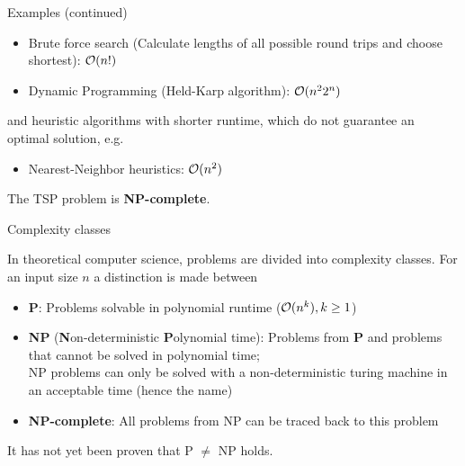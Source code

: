 \documentclass[11pt,compress,t,notes=noshow, xcolor=table]{beamer}
\begin{document}
\begin{vbframe}{Examples (continued)}
\begin{itemize}
  \item Brute force search (Calculate lengths of all possible round trips and choose shortest): $\mathcal{O}(n!)$
  \item Dynamic Programming (Held-Karp algorithm): $\mathcal{O}(n^22^n)$
\end{itemize}

and heuristic algorithms with shorter runtime, which do not guarantee an optimal solution, e.g.

\begin{itemize}
  \item Nearest-Neighbor heuristics: $\mathcal{O}(n^2)$
\end{itemize}

The TSP problem is \textbf{NP-complete}.

\end{vbframe}


\begin{vbframe}{Complexity classes}

In theoretical computer science, problems are divided into complexity classes. For an input size $n$ a distinction is made between

\begin{itemize}
\item \textbf{P}: Problems solvable in polynomial runtime ($\mathcal{O}(n^k), k\ge 1$)
\item \textbf{NP} (\textbf{N}on-deterministic \textbf{P}olynomial time): Problems from \textbf{P} and problems that cannot be solved in polynomial time;\\ NP problems can only be solved with a non-deterministic turing machine in an acceptable time (hence the name)
\item \textbf{NP-complete}: All problems from NP can be traced back to this problem
\end{itemize}

It has not yet been proven that P $\ne$ NP holds.

\end{vbframe}

\endlecture
\end{document}
